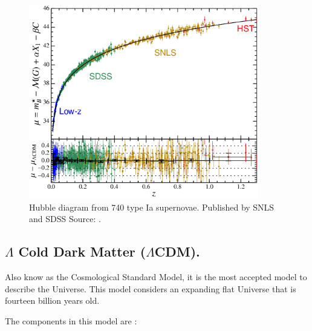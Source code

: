 \documentclass[onecolumn,           %
               showpacs,            %
               preprintnumbers,     %
               aps,                 %
               prl,          	    %
               letterpaper,             %
               superscriptaddress,      %
               nofootinbib,         %
               tightenlines,        %
               floats,floatfix      %
               ,usenatbib,
               ]{revtex4-1}
\begin{document}
\begin{figure}[h]
	\centering
	\includegraphics[width=10cm]{FiguresCosmo/snls_fig2.png}	
	\caption{Hubble diagram from 740 type Ia supernovae. Published by SNLS and SDSS Source: \cite{snls}.}
\end{figure}

\subsection{$\Lambda$ Cold Dark Matter ($\Lambda$CDM).}
Also know as the Cosmological Standard Model, it is the most accepted model to describe the Universe. This model considers an expanding flat Universe that is fourteen billion years old. 

The components in this model are \cite{liddle}:
\end{document}
